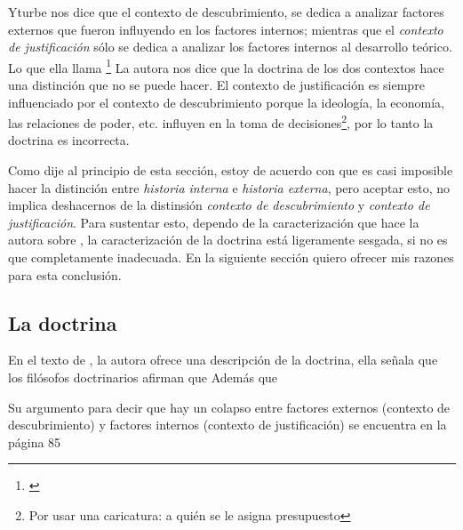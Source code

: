 Yturbe nos dice que el contexto de descubrimiento, se dedica a analizar factores externos que fueron influyendo en los factores internos; mientras que el \emph{contexto de justificación} sólo se dedica a analizar los factores internos al desarrollo teórico.
Lo que ella llama \footnote{
	 \cite[][p. 75]{Yturbe1995}
}
La autora nos dice que la doctrina de los dos contextos hace una distinción que no se puede hacer.
El contexto de justificación es siempre influenciado por el contexto de descubrimiento porque la ideología, la economía, las relaciones de poder, etc. influyen en la toma de decisiones\footnote{Por usar una caricatura: a quién se le asigna presupuesto}, por lo tanto la doctrina es incorrecta.

Como dije al principio de esta sección, estoy de acuerdo con que es casi imposible hacer la distinción entre \emph{historia interna} e \emph{historia externa}, pero aceptar esto, no implica deshacernos de la distinsión \emph{contexto de descubrimiento} y \emph{contexto de justificación}.
Para sustentar esto, dependo de la caracterización que hace la autora sobre , la caracterización de la doctrina está ligeramente sesgada, si no es que completamente inadecuada.
En la siguiente sección quiero ofrecer mis razones para esta conclusión.

\subsection{La doctrina}

\noindent En el texto de \textcite[][p.75]{Yturbe1995}, la autora ofrece una descripción de la doctrina, ella señala que los filósofos doctrinarios afirman que 
Además que 


Su argumento para decir que hay un colapso entre factores externos (contexto de descubrimiento) y factores internos (contexto de justificación) se encuentra en la página 85

